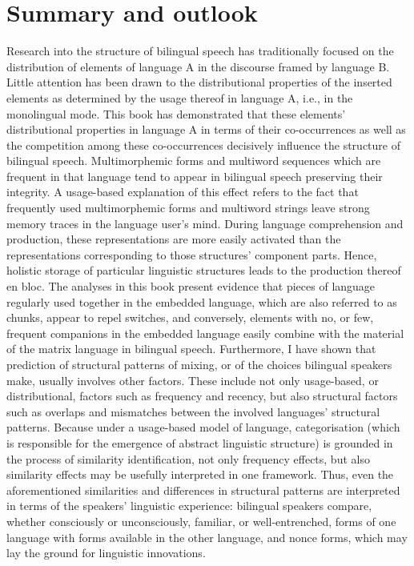 \chapter{Summary and outlook}

Research into the structure of bilingual speech has traditionally focused on the distribution of elements of language A in the discourse framed by language B. Little attention has been drawn to the distributional properties of the inserted elements as determined by the usage thereof in language A, i.e., in the monolingual mode. This book has demonstrated that these elements’ distributional properties in language A in terms of their co-occurrences as well as the competition among these co-occurrences decisively influence the structure of bilingual speech. Multimorphemic forms and multiword sequences which are frequent in that language tend to appear in bilingual speech preserving their integrity. A usage-based explanation of this effect refers to the fact that frequently used multimorphemic forms and multiword strings leave strong memory traces in the language user's mind. During language comprehension and production, these representations are more easily activated than the representations corresponding to those structures’ component parts. Hence, holistic storage of particular linguistic structures leads to the production thereof en bloc. The analyses in this book present evidence that pieces of language regularly used together in the  embedded language, which are also referred to as chunks, appear to repel switches, and conversely, elements with no, or few, frequent companions in the embedded language easily combine with the material of the matrix language in bilingual speech. Furthermore, I have  shown that prediction of structural patterns of mixing, or of the choices bilingual speakers make, usually involves other factors. These include not only usage-based, or distributional, factors such as frequency and recency, but also structural factors such as overlaps and mismatches between the involved languages’ structural patterns. Because under a usage-based model of language, categorisation (which is responsible for the emergence of abstract linguistic structure) is grounded in the process of similarity identification, not only frequency effects, but also similarity effects may be usefully interpreted in one framework. Thus, even the aforementioned similarities and differences in structural patterns are interpreted in terms of the speakers’ linguistic experience: bilingual speakers compare, whether consciously or unconsciously, familiar, or well-entrenched, forms of one language with forms available in the other language, and nonce forms, which may lay the ground for linguistic innovations. %

